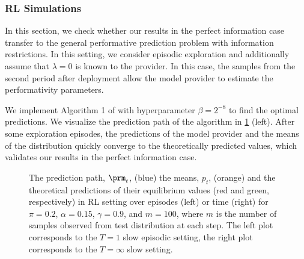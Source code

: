 \subsubsection{RL Simulations}
\label{sec:one-rl}

In this section, we check whether our results in the perfect information case
transfer to the general performative prediction problem with information
restrictions. In this setting, we consider episodic exploration and
additionally assume that $\lambda = 0$ is known to the provider. In this case,
the samples from the second period after deployment allow the model provider to
estimate the performativity parameters.

We implement Algorithm 1 of \citet{l22w} with hyperparameter
$\beta=2^{-8}$ to find the optimal predictions. We visualize the prediction path
of the algorithm in \cref{fig:rl} (left). After some exploration episodes, the
predictions of the model provider and the means of the distribution quickly
converge to the theoretically predicted values, which validates our results in the perfect information case.

\begin{figure}[ht]
    
    \caption{The prediction path, $\prm_t$, (blue) the means, $p_t$, (orange)
    and the theoretical predictions of their equilibrium values (red and green,
    respectively) in RL setting over episodes (left) or time (right) for $\pi =
    0.2$, $\alpha = 0.15$, $\gamma = 0.9$, and $m=100$, where $m$ is the number
    of samples observed from test distribution at each step. The left plot
    corresponds to the $T=1$ slow episodic setting, the right plot corresponds
    to the $T=\infty$ slow setting.}
    \label{fig:rl}
\end{figure}
